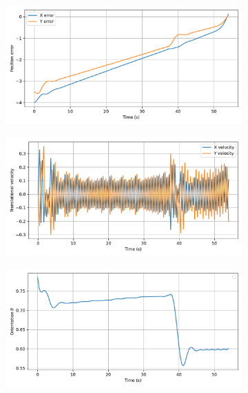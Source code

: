 \begin{figure}[H]
    \centering
    \begin{subfigure}{0.45\linewidth}
        \centering
        \includegraphics[width=\linewidth]{figures/Simulations/sim2unkenv/evolution_0.pdf}
    \end{subfigure}
    \begin{subfigure}{0.45\linewidth}
        \centering
        \includegraphics[width=\linewidth]{figures/Simulations/sim2unkenv/evolution_1.pdf}
    \end{subfigure}
    \hfill
    \begin{subfigure}{0.45\linewidth}
        \centering
        \includegraphics[width=\linewidth]{figures/Simulations/sim2unkenv/evolution_2.pdf}

\end{subfigure}
\end{figure}
